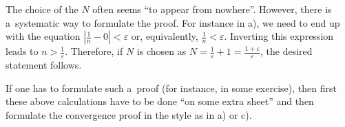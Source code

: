 \begin{Remark}{}
The choice of the $N$ often seems ``to appear from nowhere''. However, there is a~systematic way to formulate the proof. For instance in a), we need to end up with the equation $|\frac1n-0|<\varepsilon$ or, equivalently, $\frac1n<\varepsilon$. Inverting this expression leads to $n>\frac1\varepsilon$. Therefore, if $N$ is chosen as $N=\frac1\varepsilon+1=\frac{1+\varepsilon}\varepsilon$, the desired statement follows.

If one has to formulate such a~proof (for instance, in some exercise), then first these above calculations have to be done ``on some extra sheet'' and then formulate the convergence proof in the style as in a) or c).
\end{Remark}

